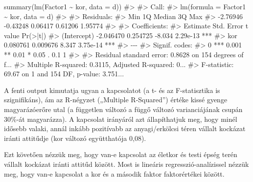 \documentclass[
  letterpaper,
]{krantz}
\makeatletter
\newenvironment{Shaded}{\begin{snugshade}}{\end{snugshade}}
\newcommand{\AttributeTok}[1]{\textcolor[rgb]{0.40,0.45,0.13}{#1}}
\newcommand{\CommentTok}[1]{\textcolor[rgb]{0.37,0.37,0.37}{#1}}
\newcommand{\FunctionTok}[1]{\textcolor[rgb]{0.28,0.35,0.67}{#1}}
\newcommand{\NormalTok}[1]{\textcolor[rgb]{0.00,0.23,0.31}{#1}}
\newcommand{\SpecialCharTok}[1]{\textcolor[rgb]{0.37,0.37,0.37}{#1}}
\newenvironment{kframe}{%
\medskip{}
\setlength{\fboxsep}{.8em}
 \def\at@end@of@kframe{}%
 \ifinner\ifhmode%
  \def\at@end@of@kframe{\end{minipage}}%
  \begin{minipage}{\columnwidth}%
 \fi\fi%
 \def\FrameCommand##1{\hskip\@totalleftmargin \hskip-\fboxsep
 \colorbox{shadecolor}{##1}\hskip-\fboxsep
     \hskip-\linewidth \hskip-\@totalleftmargin \hskip\columnwidth}%
 \MakeFramed {\advance\hsize-\width
   \@totalleftmargin\z@ \linewidth\hsize
   \@setminipage}}%
 {\par\unskip\endMakeFramed%
 \at@end@of@kframe}
\renewenvironment{Shaded}{\begin{kframe}}{\end{kframe}}
\makeatother
\begin{document}
\begin{Shaded}
\begin{Highlighting}[]
\FunctionTok{summary}\NormalTok{(}\FunctionTok{lm}\NormalTok{(Factor1 }\SpecialCharTok{\textasciitilde{}}\NormalTok{ kor, }\AttributeTok{data =}\NormalTok{ d))}
\CommentTok{\#\textgreater{} }
\CommentTok{\#\textgreater{} Call:}
\CommentTok{\#\textgreater{} lm(formula = Factor1 \textasciitilde{} kor, data = d)}
\CommentTok{\#\textgreater{} }
\CommentTok{\#\textgreater{} Residuals:}
\CommentTok{\#\textgreater{}      Min       1Q   Median       3Q      Max }
\CommentTok{\#\textgreater{} {-}2.76946 {-}0.43248  0.06417  0.61206  1.95774 }
\CommentTok{\#\textgreater{} }
\CommentTok{\#\textgreater{} Coefficients:}
\CommentTok{\#\textgreater{}              Estimate Std. Error t value Pr(\textgreater{}|t|)    }
\CommentTok{\#\textgreater{} (Intercept) {-}2.046470   0.254725  {-}8.034 2.29e{-}13 ***}
\CommentTok{\#\textgreater{} kor          0.080761   0.009676   8.347 3.75e{-}14 ***}
\CommentTok{\#\textgreater{} {-}{-}{-}}
\CommentTok{\#\textgreater{} Signif. codes:  }
\CommentTok{\#\textgreater{} 0 \textquotesingle{}***\textquotesingle{} 0.001 \textquotesingle{}**\textquotesingle{} 0.01 \textquotesingle{}*\textquotesingle{} 0.05 \textquotesingle{}.\textquotesingle{} 0.1 \textquotesingle{} \textquotesingle{} 1}
\CommentTok{\#\textgreater{} }
\CommentTok{\#\textgreater{} Residual standard error: 0.8628 on 154 degrees of f...}
\CommentTok{\#\textgreater{} Multiple R{-}squared:  0.3115, Adjusted R{-}squared:  0...}
\CommentTok{\#\textgreater{} F{-}statistic: 69.67 on 1 and 154 DF,  p{-}value: 3.751...}
\end{Highlighting}
\end{Shaded}

A fenti output kimutatja ugyan a kapcsolatot (a t- és az F-statisztika
is szignifikáns), ám az R-négyzet („Multiple R-Squared'') értéke kissé
gyenge magyarázóerőre utal (a független változó a függő változó
varianciájának csupán 30\%-át magyarázza). A kapcsolat irányáról azt
állapíthatjuk meg, hogy minél idősebb valaki, annál inkább pozitívabb az
anyagi/erkölcsi téren vállalt kockázat iránti attitűdje (kor változó
együtthatója 0,08).

Ezt követően nézzük meg, hogy van-e kapcsolat az életkor és testi épség
terén vállalt kockázat iránti attitűd között. Most is lineáris
regresszió-analízissel nézzük meg, hogy van-e kapcsolat a kor és a
második faktor faktorértékei között.
\end{document}
